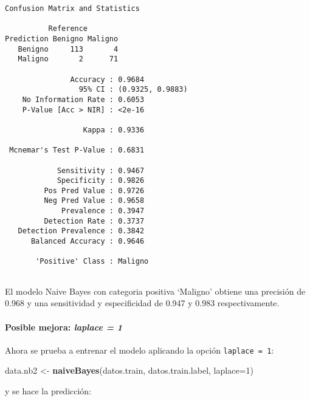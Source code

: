 \documentclass[
]{article}
\newenvironment{Shaded}{\begin{snugshade}}{\end{snugshade}}
\newcommand{\DataTypeTok}[1]{\textcolor[rgb]{0.13,0.29,0.53}{#1}}
\newcommand{\DecValTok}[1]{\textcolor[rgb]{0.00,0.00,0.81}{#1}}
\newcommand{\KeywordTok}[1]{\textcolor[rgb]{0.13,0.29,0.53}{\textbf{#1}}}
\newcommand{\NormalTok}[1]{#1}
\newcommand{\StringTok}[1]{\textcolor[rgb]{0.31,0.60,0.02}{#1}}
\let\oldparagraph\paragraph
\renewcommand{\paragraph}[1]{\oldparagraph{#1}\mbox{}}
\begin{document}
\begin{verbatim}
Confusion Matrix and Statistics

          Reference
Prediction Benigno Maligno
   Benigno     113       4
   Maligno       2      71
                                          
               Accuracy : 0.9684          
                 95% CI : (0.9325, 0.9883)
    No Information Rate : 0.6053          
    P-Value [Acc > NIR] : <2e-16          
                                          
                  Kappa : 0.9336          
                                          
 Mcnemar's Test P-Value : 0.6831          
                                          
            Sensitivity : 0.9467          
            Specificity : 0.9826          
         Pos Pred Value : 0.9726          
         Neg Pred Value : 0.9658          
             Prevalence : 0.3947          
         Detection Rate : 0.3737          
   Detection Prevalence : 0.3842          
      Balanced Accuracy : 0.9646          
                                          
       'Positive' Class : Maligno         
                                          
\end{verbatim}

El modelo Naive Bayes con categoria positiva `Maligno' obtiene una
precisión de 0.968 y una sensitividad y especificidad de 0.947 y 0.983
respectivamente.

\hypertarget{posible-mejora-laplace-1}{%
\paragraph{\texorpdfstring{Posible mejora: \emph{laplace =
1}}{Posible mejora: laplace = 1}}\label{posible-mejora-laplace-1}}

Ahora se prueba a entrenar el modelo aplicando la opción
\texttt{laplace\ =\ 1}:

\begin{Shaded}
\begin{Highlighting}[]
\NormalTok{data.nb2 <-}\StringTok{ }\KeywordTok{naiveBayes}\NormalTok{(datos.train, datos.train.label, }\DataTypeTok{laplace=}\DecValTok{1}\NormalTok{)}
\end{Highlighting}
\end{Shaded}

y se hace la predicción:
\end{document}
